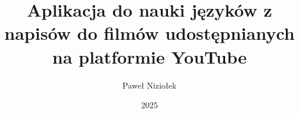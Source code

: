 \documentclass[thesis=inz]{TemplateCore/Dyplom}
\title{Aplikacja do nauki języków z napisów do filmów udostępnianych na platformie YouTube
}
\author{Paweł Niziołek}
\date{2025}
\begin{document}
\frontpages


\bibliografia


\clearpage
\clearpage
\listoffigures

\clearpage
\lstlistoflistings
\end{document}
